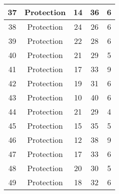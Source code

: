 \documentclass[results.tex]{subfiles}
\begin{document}
\begin{center}
\begin{tabular}{| c || c | c | c | c |}
            \hline
            37                      & Protection                   & 14                     & 36                      & 6                    \\
            \hline
            38                      & Protection                   & 24                     & 26                      & 6                    \\
            \hline
            39                      & Protection                   & 22                     & 28                      & 6                    \\
            \hline
            40                      & Protection                   & 21                     & 29                      & 5                    \\
            \hline
            41                      & Protection                   & 17                     & 33                      & 9                    \\
            \hline
            42                      & Protection                   & 19                     & 31                      & 6                    \\
            \hline
            43                      & Protection                   & 10                     & 40                      & 6                    \\
            \hline
            44                      & Protection                   & 21                     & 29                      & 4                    \\
            \hline
            45                      & Protection                   & 15                     & 35                      & 5                    \\
            \hline
            46                      & Protection                   & 12                     & 38                      & 9                    \\
            \hline
            47                      & Protection                   & 17                     & 33                      & 6                    \\
            \hline
            48                      & Protection                   & 20                     & 30                      & 5                    \\
            \hline
            49                      & Protection                   & 18                     & 32                      & 6                    \\
            \hline
        \end{tabular}
    \end{center}
\end{document}

